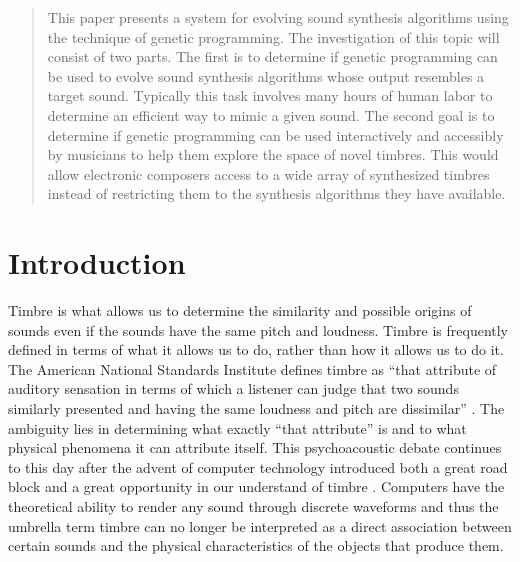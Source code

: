 \documentclass[12pt]{article}
\begin{document}
\maketitle

\begin{abstract}
This paper presents a system for evolving sound synthesis algorithms using the technique of genetic programming. The investigation of this topic will consist of two parts. The first is to determine if genetic programming can be used to evolve sound synthesis algorithms whose output resembles a target sound. Typically this task involves many hours of human labor to determine an efficient way to mimic a given sound. The second goal is to determine if genetic programming can be used interactively and accessibly by musicians to help them explore the space of novel timbres. This would allow electronic composers access to a wide array of synthesized timbres instead of restricting them to the synthesis algorithms they have available.
\end{abstract}

\section{Introduction}
Timbre is what allows us to determine the similarity and possible origins of sounds even if the sounds have the same pitch and loudness. Timbre is frequently defined in terms of what it allows us to do, rather than how it allows us to do it. The American National Standards Institute defines timbre as ``that attribute of auditory sensation in terms of which a listener can judge that two sounds similarly presented and having the same loudness and pitch are dissimilar'' \citep{american1960american}. The ambiguity lies in determining what exactly ``that attribute'' is and to what physical phenomena it can attribute itself. This psychoacoustic debate continues to this day after the advent of computer technology introduced both a great road block and a great opportunity in our understand of timbre \citep{erickson1975sound}. Computers have the theoretical ability to render any sound through discrete waveforms and thus the umbrella term timbre can no longer be interpreted as a direct association between certain sounds and the physical characteristics of the objects that produce them.
\end{document}
